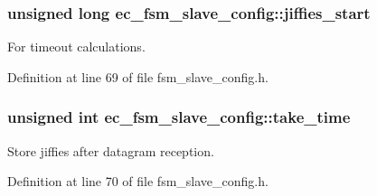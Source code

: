 \subsubsection[{jiffies\-\_\-start}]{\setlength{\rightskip}{0pt plus 5cm}unsigned long ec\-\_\-fsm\-\_\-slave\-\_\-config\-::jiffies\-\_\-start}\label{structec__fsm__slave__config_aaca0412b1e9430abb207655e6a42830a}


For timeout calculations. 



Definition at line 69 of file fsm\-\_\-slave\-\_\-config.\-h.

\subsubsection[{take\-\_\-time}]{\setlength{\rightskip}{0pt plus 5cm}unsigned int ec\-\_\-fsm\-\_\-slave\-\_\-config\-::take\-\_\-time}\label{structec__fsm__slave__config_a884fcfd4e7f6e89d0d99dab720939c07}


Store jiffies after datagram reception. 



Definition at line 70 of file fsm\-\_\-slave\-\_\-config.\-h.

